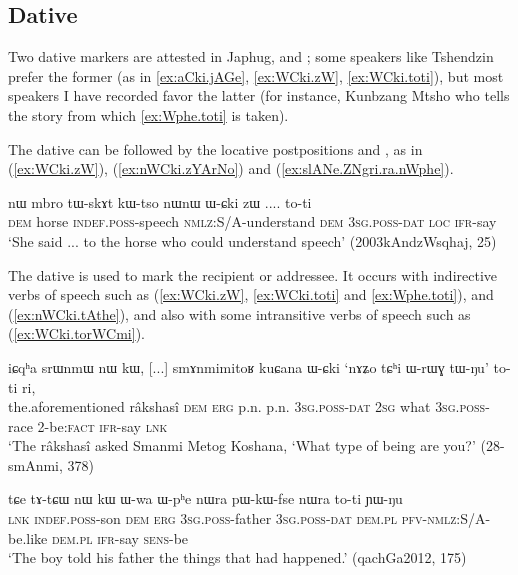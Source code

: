 \subsection{Dative} \label{sec:dative} 
Two dative markers are attested in Japhug,  and ; some speakers like Tshendzin prefer the former (as in \ref{ex:aCki.jAGe}, \ref{ex:WCki.zW}, \ref{ex:WCki.toti}), but most speakers I have recorded favor the latter (for instance, Kunbzang Mtsho who tells the story from which \ref{ex:Wphe.toti} is taken).

The dative can be followed by the locative postpositions  and , as in (\ref{ex:WCki.zW}), (\ref{ex:nWCki.zYArNo}) and (\ref{ex:slANe.ZNgri.ra.nWphe}).


\begin{exe}
\ex \label{ex:WCki.zW}
\gll nɯ mbro tɯ-skɤt kɯ-tso nɯnɯ ɯ-ɕki zɯ .... to-ti \\
\textsc{dem} horse \textsc{indef}.\textsc{poss}-speech \textsc{nmlz}:S/A-understand \textsc{dem} \textsc{3sg}.\textsc{poss}-\textsc{dat} \textsc{loc} { } \textsc{ifr}-say \\
\glt `She said ... to the horse who could understand speech' (2003kAndzWsqhaj, 25)
\end{exe}

The dative is used to mark the recipient or addressee. It occurs with indirective verbs of speech such as  (\ref{ex:WCki.zW}, \ref{ex:WCki.toti} and \ref{ex:Wphe.toti}),  and  (\ref{ex:nWCki.tAthe}), and also with some intransitive verbs of speech such as  (\ref{ex:WCki.torWCmi}).

\begin{exe}
\ex \label{ex:WCki.toti}
\gll iɕqʰa srɯnmɯ nɯ kɯ, [...] smɤnmimitoʁ kuɕana ɯ-ɕki `nɤʑo tɕʰi ɯ-rɯɣ tɯ-ŋu' to-ti ri, \\
the.aforementioned râkshasî \textsc{dem} \textsc{erg} { } p.n. p.n. \textsc{3sg}.\textsc{poss}-\textsc{dat} \textsc{2sg} what \textsc{3sg}.\textsc{poss}-race 2-be:\textsc{fact} \textsc{ifr}-say \textsc{lnk} \\
\glt `The râkshasî asked Smanmi Metog Koshana, `What type of being are you?' (28-smAnmi, 378)
\end{exe}

\begin{exe}
\ex \label{ex:Wphe.toti}
\gll tɕe tɤ-tɕɯ nɯ kɯ ɯ-wa ɯ-pʰe nɯra pɯ-kɯ-fse nɯra to-ti ɲɯ-ŋu \\
\textsc{lnk} \textsc{indef}.\textsc{poss}-son \textsc{dem} \textsc{erg} \textsc{3sg}.\textsc{poss}-father \textsc{3sg}.\textsc{poss}-\textsc{dat} \textsc{dem}.\textsc{pl} \textsc{pfv}-\textsc{nmlz}:S/A-be.like \textsc{dem}.\textsc{pl}  \textsc{ifr}-say \textsc{sens}-be \\
\glt `The boy told his father the things that had happened.' (qachGa2012, 175)
\end{exe}

